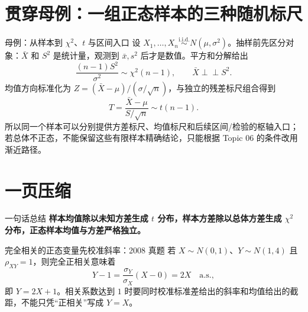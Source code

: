 \documentclass[11pt,a4paper]{ctexart}
\newcommand{\indep}{\mathrel{\perp\!\!\!\perp}}
\begin{document}
\section{贯穿母例：一组正态样本的三种随机标尺}

\begin{examplebox}{母例：从样本到 $\chi^2$、$t$ 与区间入口}
设 $X_1,\ldots,X_n\overset{\mathrm{i.i.d.}}\sim N(\mu,\sigma^2)$。抽样前先区分对象：$\bar X$ 和 $S^2$ 是统计量，观测到 $\bar x,s^2$ 后才是数值。平方和分解给出
\[
\frac{(n-1)S^2}{\sigma^2}\sim\chi^2(n-1),\qquad \bar X\indep S^2.
\]
均值方向标准化为 $Z=(\bar X-\mu)/(\sigma/\sqrt n)$，与独立的残差标尺组合得到
\[
T=\frac{\bar X-\mu}{S/\sqrt n}\sim t(n-1).
\]
所以同一个样本可以分别提供方差标尺、均值标尺和后续区间/检验的枢轴入口；若总体不正态，不能保留这些有限样本精确结论，只能根据 Topic 06 的条件改用渐近路径。
\end{examplebox}

\section{一页压缩}

\begin{corebox}{一句话总结}
\centering
\textbf{样本均值除以未知方差生成 $t$ 分布，样本方差除以总体方差生成 $\chi^2$ 分布，正态样本均值与方差严格独立。}
\end{corebox}

\begin{examplebox}{完全相关的正态变量先校准斜率：2008 真题}
若 $X\sim N(0,1)$、$Y\sim N(1,4)$ 且 $\rho_{XY}=1$，则完全正相关意味着
\[
Y-1=\frac{\sigma_Y}{\sigma_X}(X-0)=2X
\quad\text{a.s.},
\]
即 $Y=2X+1$。相关系数达到 $1$ 时要同时校准标准差给出的斜率和均值给出的截距，不能只凭“正相关”写成 $Y=X$。
\end{examplebox}
\end{document}
